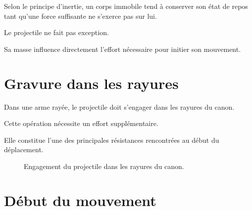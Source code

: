 Selon le principe d'inertie, un corps immobile tend à conserver son état de
repos tant qu'une force suffisante ne s'exerce pas sur lui.

Le projectile ne fait pas exception.

Sa masse influence directement l'effort nécessaire pour initier son mouvement.

\section{Gravure dans les rayures}

Dans une arme rayée, le projectile doit s'engager dans les rayures du canon.

Cette opération nécessite un effort supplémentaire.

Elle constitue l'une des principales résistances rencontrées au début du
déplacement.

\begin{figure}[htbp]
\centering


\caption{Engagement du projectile dans les rayures du canon.}
\label{fig:gravure_projectile}

\end{figure}

\section{Début du mouvement}

